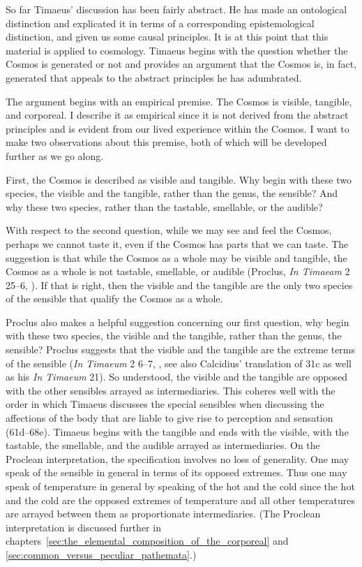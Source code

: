 So far Timaeus' discussion has been fairly abstract. He has made an ontological distinction and explicated it in terms of a corresponding epistemological distinction, and given us some causal principles. It is at this point that this material is applied to cosmology. Timaeus begins with the question whether the Cosmos is generated or not and provides an argument that the Cosmos is, in fact, generated that appeals to the abstract principles he has adumbrated.

The argument begins with an empirical premise. The Cosmos is visible, tangible, and corporeal. I describe it as empirical since it is not derived from the abstract principles and is evident from our lived experience within the Cosmos. I want to make two observations about this premise, both of which will be developed further as we go along.

First, the Cosmos is described as visible and tangible. Why begin with these two species, the visible and the tangible, rather than the genus, the sensible? And why these two species, rather than the tastable, smellable, or the audible? 

With respect to the second question, while we may see and feel the Cosmos, perhaps we cannot taste it, even if the Cosmos has parts that we can taste. The suggestion is that while the Cosmos as a whole may be visible and tangible, the Cosmos as a whole is not tastable, smellable, or audible (Proclus, \emph{In Timaeam} 2 25--6, \citealt{Diehl:1903re}). If that is right, then the visible and the tangible are the only two species of the sensible that qualify the Cosmos as a whole.

Proclus also makes a helpful suggestion concerning our first question, why begin with these two species, the visible and the tangible, rather than the genus, the sensible? Proclus suggests that the visible and the tangible are the extreme terms of the sensible (\emph{In Timaeum} 2 6--7, \citealt{Diehl:1903re}, see also Calcidius' translation of 31c as well as his \emph{In Timaeum} 21). So understood, the visible and the tangible are opposed with the other sensibles arrayed as intermediaries. This coheres well with the order in which Timaeus discusses the special sensibles when discussing the affections of the body that are liable to give rise to perception and sensation (61d--68e). Timaeus begins with the tangible and ends with the visible, with the tastable, the smellable, and the audible arrayed as intermediaries. On the Proclean interpretation, the specification involves no loss of generality. One may speak of the sensible in general in terms of its opposed extremes. Thus one may speak of temperature in general by speaking of the hot and the cold since the hot and the cold are the opposed extremes of temperature and all other temperatures are arrayed between them as proportionate intermediaries. (The Proclean interpretation is discussed further in chapters~\ref{sec:the_elemental_composition_of_the_corporeal} and \ref{sec:common_versus_peculiar_pathemata}.)

